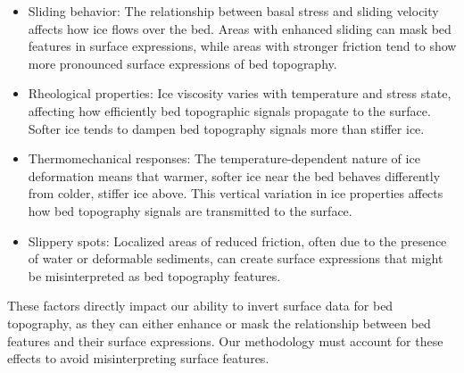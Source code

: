 \begin{itemize}
    \item Sliding behavior: The relationship between basal stress and sliding velocity affects how ice flows over the bed. Areas with enhanced sliding can mask bed features in surface expressions, while areas with stronger friction tend to show more pronounced surface expressions of bed topography.
    
    \item Rheological properties: Ice viscosity varies with temperature and stress state, affecting how efficiently bed topographic signals propagate to the surface. Softer ice tends to dampen bed topography signals more than stiffer ice.
    
    \item Thermomechanical responses: The temperature-dependent nature of ice deformation means that warmer, softer ice near the bed behaves differently from colder, stiffer ice above. This vertical variation in ice properties affects how bed topography signals are transmitted to the surface.
    
    \item Slippery spots: Localized areas of reduced friction, often due to the presence of water or deformable sediments, can create surface expressions that might be misinterpreted as bed topography features.
\end{itemize}

These factors directly impact our ability to invert surface data for bed topography, as they can either enhance or mask the relationship between bed features and their surface expressions. Our methodology must account for these effects to avoid misinterpreting surface features.



